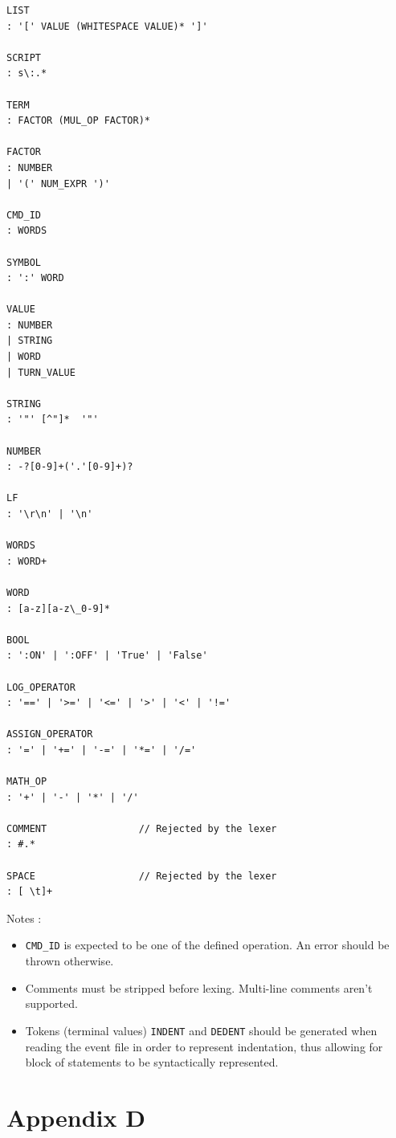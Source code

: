 \documentclass[11pt]{article}
\begin{document}
{\begin{Verbatim}[frame=single, fontsize=\footnotesize]
LIST
: '[' VALUE (WHITESPACE VALUE)* ']'

SCRIPT
: s\:.*

TERM
: FACTOR (MUL_OP FACTOR)*

FACTOR
: NUMBER
| '(' NUM_EXPR ')'

CMD_ID
: WORDS

SYMBOL
: ':' WORD

VALUE
: NUMBER
| STRING
| WORD
| TURN_VALUE

STRING
: '"' [^"]*  '"'

NUMBER
: -?[0-9]+('.'[0-9]+)?

LF
: '\r\n' | '\n'

WORDS
: WORD+

WORD
: [a-z][a-z\_0-9]*

BOOL
: ':ON' | ':OFF' | 'True' | 'False'

LOG_OPERATOR
: '==' | '>=' | '<=' | '>' | '<' | '!='

ASSIGN_OPERATOR
: '=' | '+=' | '-=' | '*=' | '/='

MATH_OP
: '+' | '-' | '*' | '/'

COMMENT                // Rejected by the lexer
: #.*

SPACE                  // Rejected by the lexer
: [ \t]+
\end{Verbatim}

\newpage 
Notes :
\begin{itemize}
	\item \verb|CMD_ID| is expected to be one of the defined operation. An error should be thrown otherwise.
	
	\item Comments must be stripped before lexing. Multi-line comments aren't supported.
	
	\item Tokens (terminal values) \verb|INDENT| and \verb|DEDENT| should be generated when reading the event file in order to represent indentation, thus allowing for block of statements to be syntactically represented.
	
\end{itemize}












\newpage
\section*{Appendix D}

}
\end{document}

